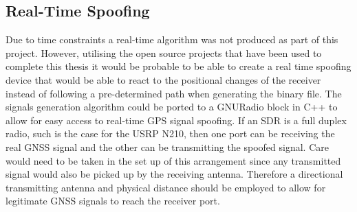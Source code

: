 \subsection{Real-Time Spoofing}
Due to time constraints a real-time algorithm was not produced as part of this project. However, utilising the open source projects that have been used to complete this
thesis it would be probable to be able to create a real time spoofing device that would be able to react to the positional changes of the receiver instead of following a
pre-determined path when generating the binary file. The signals generation algorithm could be ported to a GNURadio block in C++ to allow for easy access to real-time GPS
signal spoofing. If an SDR is a full duplex radio, such is the case for the USRP N210, then one port can be receiving the real GNSS signal and the other can be
transmitting the spoofed signal. Care would need to be taken in the set up of this arrangement since any transmitted signal would also be picked up by the receiving
antenna. Therefore a directional transmitting antenna and physical distance should be employed to allow for legitimate GNSS signals to reach the receiver port. 